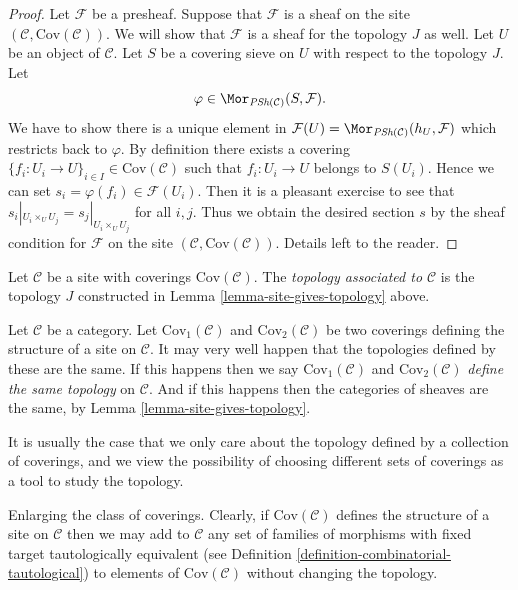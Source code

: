 \begin{proof}
\medskip\noindent
Let $\mathcal{F}$ be a presheaf. Suppose that $\mathcal{F}$
is a sheaf on the site $(\mathcal{C}, \text{Cov}(\mathcal{C}))$.
We will show that $\mathcal{F}$ is a sheaf for the topology $J$
as well. Let $U$ be an object of $\mathcal{C}$. Let
$S$ be a covering sieve on $U$ with respect to the topology $J$.
Let
$$
\varphi \in \Mor_{\textit{PSh}(\mathcal{C})}(S, \mathcal{F}).
$$
We have to show there is a unique element in
$\mathcal{F}(U) = \Mor_{\textit{PSh}(\mathcal{C})}(h_U, \mathcal{F})$
which restricts back to $\varphi$. By definition there exists
a covering $\{f_i : U_i \to U\}_{i\in I} \in \text{Cov}(\mathcal{C})$
such that $f_i : U_i \to U$ belongs to $S(U_i)$.  Hence
we can set $s_i = \varphi(f_i) \in \mathcal{F}(U_i)$.
Then it is a pleasant exercise to see that
$s_i|_{U_i \times_U U_j} = s_j|_{U_i \times_U U_j}$ for all
$i, j$. Thus we obtain the desired section $s$ by the sheaf
condition for $\mathcal{F}$ on the site
$(\mathcal{C}, \text{Cov}(\mathcal{C}))$.
Details left to the reader.
\end{proof}

\begin{definition}
\label{definition-topology-associated-site}
Let $\mathcal{C}$ be a site with coverings $\text{Cov}(\mathcal{C})$.
The {\it topology associated to $\mathcal{C}$} is the topology
$J$ constructed in Lemma \ref{lemma-site-gives-topology} above.
\end{definition}

\noindent
Let $\mathcal{C}$ be a category.
Let $\text{Cov}_1(\mathcal{C})$ and $\text{Cov}_2(\mathcal{C})$
be two coverings defining the structure of a site on $\mathcal{C}$.
It may very well happen that the topologies defined
by these are the same. If this happens
then we say $\text{Cov}_1(\mathcal{C})$ and
$\text{Cov}_2(\mathcal{C})$ {\it define the same topology} on
$\mathcal{C}$. And if this happens then the categories of sheaves
are the same, by Lemma \ref{lemma-site-gives-topology}.

\medskip\noindent
It is usually the case that we only care about the topology defined
by a collection of coverings, and we view the possibility of choosing
different sets of coverings as a tool to study the topology.

\begin{remark}
\label{remark-enlarge-coverings}
Enlarging the class of coverings.
Clearly, if $\text{Cov}(\mathcal{C})$
defines the structure of a site on $\mathcal{C}$ then we may
add to $\mathcal{C}$ any set of families of morphisms with fixed target
tautologically equivalent
(see Definition \ref{definition-combinatorial-tautological})
to elements of $\text{Cov}(\mathcal{C})$ without changing the topology.
\end{remark}

